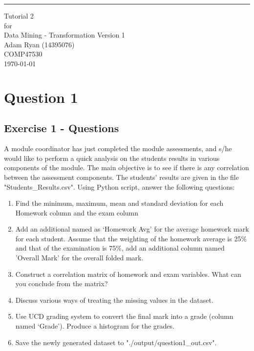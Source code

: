 \documentclass{scrreprt}
\date{}
\def\myversion{1 }
\begin{document}
	
	\begin{flushright}
		\rule{16cm}{5pt}\vskip1cm
		\begin{bfseries}
			\Huge{Tutorial 2\\}
			\vspace{1.9cm}
			for\\
			\vspace{1.9cm}
			Data Mining - Transformation
			\vspace{1.9cm}
			\LARGE{Version \myversion}\\
			\vspace{1.9cm}
			Adam Ryan (14395076)\\
			\vspace{1.9cm}
			COMP47530\\
			\vspace{1.9cm}
			\today\\
		\end{bfseries}
	\end{flushright}
	
	\tableofcontents

	
\chapter{Question 1}
\section{Exercise 1 - Questions}\label{E1Q}

A module coordinator has just completed the module assessments, and s/he would like to perform a quick analysis on the students results in various components of the module. The main objective is to see if there is any correlation between the assessment components. The students’ results are given in the file "Students\_Results.csv". Using Python script, answer the following questions:

\begin{enumerate}
\item Find the minimum, maximum, mean and standard deviation for each Homework column and the exam column
\item Add an additional named as ‘Homework Avg’ for the average homework mark for each student. Assume that the weighting of the homework average is 25\% and that of the examination is 75\%, add an additional column named 'Overall Mark' for the overall folded mark.
\item  Construct a correlation matrix of homework and exam variables. What can you conclude from the matrix?
\item Discuss various ways of treating the missing values in the dataset.
\item Use UCD grading system to convert the final mark into a grade (column named ‘Grade’). Produce a histogram for the grades.
\item Save the newly generated dataset to "./output/question1\_out.csv".
\end{enumerate}
\end{document}

